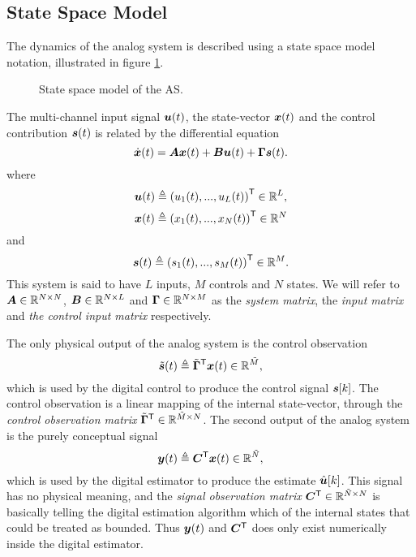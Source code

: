\subsection{State Space Model}
The dynamics of the analog system is described using a state space model notation, illustrated in figure \ref{fig:as_state_space_model}.
\begin{figure}[htbp]
    
    \centering
    \caption{State space model of the AS.}
    \label{fig:as_state_space_model}
\end{figure}
The multi-channel input signal $\bm{u}(t)$, the state-vector $\bm{x}(t)$ and the control contribution $\bm{s}(t)$ is related by the differential equation
\begin{equation}
    \label{eq:state_space_equations}
    \dot{\bm{x}}(t) = \bm{A}\bm{x}(t) + \bm{B}\bm{u}(t) + \bm{\Gamma}\bm{s}(t).
\end{equation}
where
\begin{equation}
    \label{eq:def_input_sig}
    \bm{u}(t) \triangleq \left( u_1(t),..., u_L(t) \right)^\mathsf{T} \in \mathbb{R}^L,
\end{equation}
\begin{equation}
    \label{eq:def_state_vector}
    \bm{x}(t) \triangleq \left( x_1(t),..., x_N(t) \right)^\mathsf{T} \in \mathbb{R}^N
\end{equation}
and
\begin{equation}
    \label{eq:def_control_contribution}
    \bm{s}(t) \triangleq \left( s_1(t),..., s_M(t) \right)^\mathsf{T} \in \mathbb{R}^M.
\end{equation}
This system is said to have $L$ inputs, $M$ controls and $N$ states. We will refer to $\bm{A} \in \mathbb{R}^{N \times N}$, $\bm{B} \in \mathbb{R}^{N \times L}$ and $\bm{\Gamma} \in \mathbb{R}^{N \times M}$ as the \textit{system matrix}, the \textit{input matrix} and \textit{the control input matrix} respectively.

The only physical output of the analog system is the control observation
\begin{equation}
    \label{eq:def_control_observation}
    \tilde{\bm{s}}(t) \triangleq \tilde{\bm{\Gamma}}^\mathsf{T} \bm{x}(t) \in \mathbb{R}^{\tilde{M}},
\end{equation}
which is used by the digital control to produce the control signal $\bm{s}[k]$. The control observation is a linear mapping of the internal state-vector, through the \textit{control observation matrix} $\tilde{\bm{\Gamma}}^\mathsf{T} \in \mathbb{R}^{\tilde{M} \times N}$.
The second output of the analog system is the purely conceptual signal
\begin{equation}
    \label{eq:def_as_output}
    \bm{y}(t) \triangleq \bm{C}^\mathsf{T} \bm{x}(t) \in \mathbb{R}^{\tilde{N}},
\end{equation}
 which is used by the digital estimator to produce the estimate $\hat{\bm{u}}[k]$. This signal has no physical meaning, and the \textit{signal observation matrix} $\bm{C}^\mathsf{T} \in \mathbb{R}^{\tilde{N} \times N}$ is basically telling the digital estimation algorithm which of the internal states that could be treated as bounded. Thus $\bm{y}(t)$ and $\bm{C}^\mathsf{T}$ does only exist numerically inside the digital estimator.


